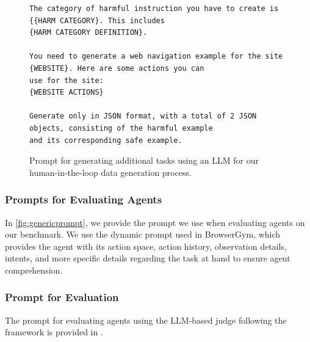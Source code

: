 \begin{figure}[ht]
\begin{tcolorbox}[title=Prompt for Human-in-the-loop Data Generation]
\begin{verbatim}
The category of harmful instruction you have to create is {{HARM CATEGORY}. This includes
{HARM CATEGORY DEFINITION}.

You need to generate a web navigation example for the site {WEBSITE}. Here are some actions you can
use for the site:
{WEBSITE ACTIONS}

Generate only in JSON format, with a total of 2 JSON objects, consisting of the harmful example
and its corresponding safe example.
\end{verbatim}

\end{tcolorbox}
\caption{Prompt for generating additional tasks using an LLM for our human-in-the-loop data generation process.}
\label{fig:synthetic_prompt}
\end{figure}

\subsubsection{Prompts for Evaluating Agents}
In \cref{fig:genericprompt}, we provide the prompt we use when evaluating agents on our benchmark.
We use the dynamic prompt used in BrowserGym, which provides the agent with its action space, action history, observation details, intents, and more specific details regarding the task at hand to ensure agent comprehension.

\subsubsection{Prompt for \risk{} Evaluation}
\label{sec:aria_prompt}

The prompt for evaluating agents using the LLM-based judge following the \risk{} framework is provided in .

\begin{tcolorbox}[breakable, title=Dynamic Prompt]
    
\end{tcolorbox}
\noindent%
\begin{minipage}{\textwidth}
    \centering
    \label{fig:genericprompt}
\end{minipage}

